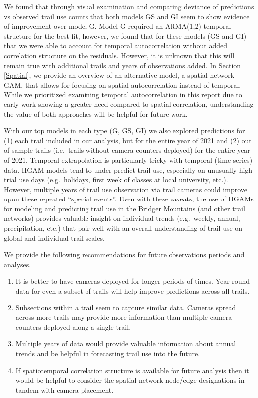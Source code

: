 \documentclass[
]{book}
\providecommand{\tightlist}{%
  \setlength{\itemsep}{0pt}\setlength{\parskip}{0pt}}
\begin{document}
We found that through visual examination and comparing deviance of predictions vs observed trail use counts that both models GS and GI seem to show evidence of improvement over model G. Model G required an ARMA(1,2) temporal structure for the best fit, however, we found that for these models (GS and GI) that we were able to account for temporal autocorrelation without added correlation structure on the residuals. However, it is unknown that this will remain true with additional trails and years of observations added. In Section \ref{Spatial}, we provide an overview of an alternative model, a spatial network GAM, that allows for focusing on spatial autocorrelation instead of temporal. While we prioritized examining temporal autocorrelation in this report due to early work showing a greater need compared to spatial correlation, understanding the value of both approaches will be helpful for future work.

With our top models in each type (G, GS, GI) we also explored predictions for (1) each trail included in our analysis, but for the entire year of 2021 and (2) out of sample trails (i.e.~trails without camera counters deployed) for the entire year of 2021. Temporal extrapolation is particularly tricky with temporal (time series) data. HGAM models tend to under-predict trail use, especially on unusually high trial use days (e.g.~holidays, first week of classes at local university, etc.). However, multiple years of trail use observation via trail cameras could improve upon these repeated ``special events''. Even with these caveats, the use of HGAMs for modeling and predicting trail use in the Bridger Mountains (and other trail networks) provides valuable insight on individual trends (e.g.~weekly, annual, precipitation, etc.) that pair well with an overall understanding of trail use on global and individual trail scales.

We provide the following recommendations for future observations periods and analyses.

\begin{enumerate}
\def\labelenumi{\arabic{enumi}.}
\tightlist
\item
  It is better to have cameras deployed for longer periods of times. Year-round data for even a subset of trails will help improve predictions across all trails.
\item
  Subsections within a trail seem to capture similar data. Cameras spread across more trails may provide more information than multiple camera counters deployed along a single trail.
\item
  Multiple years of data would provide valuable information about annual trends and be helpful in forecasting trail use into the future.
\item
  If spatiotemporal correlation structure is available for future analysis then it would be helpful to consider the spatial network node/edge designations in tandem with camera placement.
\end{enumerate}
\end{document}
